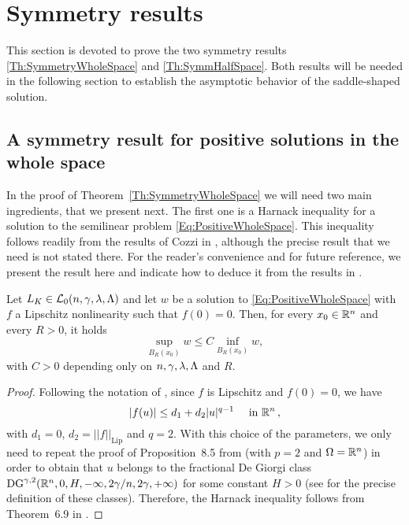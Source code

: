 \section{Symmetry results}
\label{Sec:SymmetryResults}




This section is devoted to prove the two symmetry results \ref{Th:SymmetryWholeSpace} and \ref{Th:SymmHalfSpace}. Both results will be needed in the following section to establish the asymptotic behavior of the saddle-shaped solution. 

\subsection{A symmetry result for positive solutions in the whole space}

In the proof of Theorem~\ref{Th:SymmetryWholeSpace} we will need two main ingredients, that we present next. The first one is a Harnack inequality for a solution to the semilinear problem \eqref{Eq:PositiveWholeSpace}. This inequality follows readily from the results of Cozzi in \cite{Cozzi-DeGiorgiClassesLong}, although the precise result that we need is not stated there. For the reader's convenience and for future reference, we present the result here and indicate how to deduce it from the results in \cite{Cozzi-DeGiorgiClassesLong}.

\begin{proposition}
	\label{Prop:HarnackSemilinear}
	Let $L_K\in\mathcal{L}_0(n,\gamma,\lambda,\Lambda)$ and let $w$ be a solution to \eqref{Eq:PositiveWholeSpace} with $f$ a Lipschitz nonlinearity such that $f(0) = 0$. Then, for every $x_0 \in \mathbb{R}^n$ and every $R>0$, it holds
	$$
	\sup_{B_R(x_0)} w \leq C  \inf_{B_R(x_0)} w, 
	$$
	with $C>0$  depending only on $n,\gamma,\lambda,\Lambda$ and $R$.
\end{proposition}

\begin{proof}
	Following the notation of \cite{Cozzi-DeGiorgiClassesLong}, since $f$ is Lipschitz and $f(0) = 0$, we have
	$$
	|f(u)|\leq d_1 + d_2 |u|^{q-1} \quad \text{ in } \mathbb{R}^n\,,
	$$ 
	with $d_1=0$, $d_2 =||f||_{\mathrm{Lip}}$ and $q=2$. With this choice of the parameters, we only need to repeat the proof of Proposition~8.5 from \cite{Cozzi-DeGiorgiClassesLong} (with $p=2$ and $\Omega = \mathbb{R}^n$) in order to obtain that $u$ belongs to the fractional De Giorgi class $\mathrm{DG}^{\gamma,2} ( \mathbb{R}^n , 0, H, -\infty,2\gamma/n,2\gamma,+\infty)$	for some constant $H>0$ (see \cite{Cozzi-DeGiorgiClassesLong} for the precise definition of these classes). Therefore, the Harnack inequality follows from Theorem~6.9 in \cite{Cozzi-DeGiorgiClassesLong}.
\end{proof}


